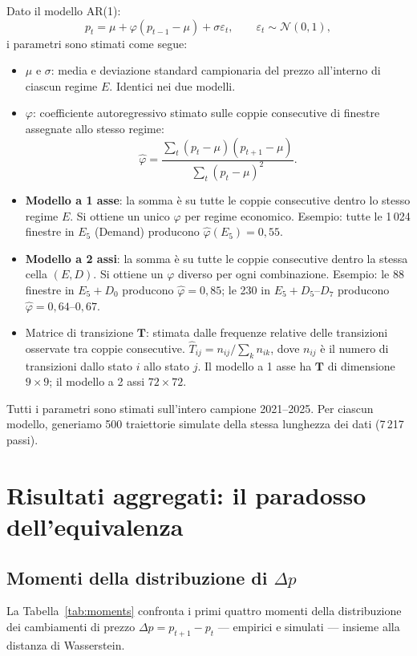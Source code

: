 \documentclass[12pt]{article}
\begin{document}
Dato il modello AR(1):
\[
p_t = \mu + \varphi(p_{t-1} - \mu) + \sigma\varepsilon_t, \qquad \varepsilon_t \sim \mathcal{N}(0,1),
\]
i parametri sono stimati come segue:
\begin{itemize}[nosep]
\item $\mu$ e $\sigma$: media e deviazione standard campionaria del prezzo all'interno di ciascun regime $E$. Identici nei due modelli.
\item $\varphi$: coefficiente autoregressivo stimato sulle coppie consecutive di finestre assegnate allo stesso regime:
\[
\hat{\varphi} = \frac{\sum_t (p_t - \mu)(p_{t+1} - \mu)}{\sum_t (p_t - \mu)^2}.
\]
\item \textbf{Modello a 1 asse}: la somma è su tutte le coppie consecutive dentro lo stesso regime $E$. Si ottiene un unico $\varphi$ per regime economico. Esempio: tutte le 1\,024 finestre in $E_5$ (Demand) producono $\hat{\varphi}(E_5) = 0{,}55$.
\item \textbf{Modello a 2 assi}: la somma è su tutte le coppie consecutive dentro la stessa cella $(E, D)$. Si ottiene un $\varphi$ diverso per ogni combinazione. Esempio: le 88 finestre in $E_5 + D_0$ producono $\hat{\varphi} = 0{,}85$; le 230 in $E_5 + D_5$--$D_7$ producono $\hat{\varphi} = 0{,}64$--$0{,}67$.
\item Matrice di transizione $\mathbf{T}$: stimata dalle frequenze relative delle transizioni osservate tra coppie consecutive. $\hat{T}_{ij} = n_{ij} / \sum_k n_{ik}$, dove $n_{ij}$ è il numero di transizioni dallo stato $i$ allo stato $j$. Il modello a 1 asse ha $\mathbf{T}$ di dimensione $9 \times 9$; il modello a 2 assi $72 \times 72$.
\end{itemize}

Tutti i parametri sono stimati sull'intero campione 2021--2025.
Per ciascun modello, generiamo 500 traiettorie simulate della stessa lunghezza dei dati (7\,217 passi).


\section{Risultati aggregati: il paradosso dell'equivalenza}

\subsection{Momenti della distribuzione di $\Delta p$}

La Tabella~\ref{tab:moments} confronta i primi quattro momenti della distribuzione dei cambiamenti di prezzo $\Delta p = p_{t+1} - p_t$ --- empirici e simulati --- insieme alla distanza di Wasserstein.
\end{document}
